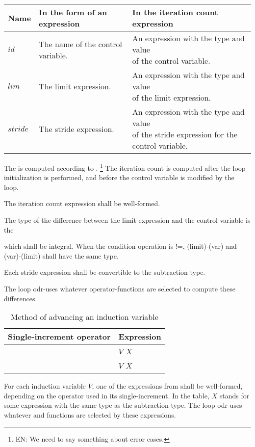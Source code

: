 \begin{table}[ht]
\begin{tabular}{|l|l|l|}
\hline
\bfseries Name&
\bfseries In the form of an expression&
\bfseries In the iteration count expression
\\ \hline
$id$&
The name of the control variable.&
\parbox[c][30pt]{2.5in}{
An expression with the type and value\\
of the control variable.
}
\\ \hline
$lim$&
The limit expression.&
\parbox[c][30pt]{2.5in}{
An expression with the type and value\\
of the limit expression.
}
\\ \hline
$stride$&
The stride expression.&
\parbox[c][40pt]{2.5in}{
An expression with the type and value\\
of the stride expression
for the control variable.
}
\\ \hline
\end{tabular}
\end{table}

The
is computed according to
.%
\footnote{EN:
We need to say something about error cases.
}
The iteration count is computed after the loop initialization is performed,
and before the control variable is modified by the loop.
\begin{cpp}
The iteration count expression shall be well-formed.
\end{cpp}

The type of the difference between the limit expression and the control variable
is the
%
\yescpp{,}
\begin{cpp}
which shall be integral.
When the condition operation is !=,
(limit)-(var) and (var)-(limit) shall have the same type.
\end{cpp}
Each stride expression shall be convertible to the subtraction type.
\begin{cpp}
The loop odr-uses whatever operator-functions are selected
to compute these differences.
\end{cpp}

\begin{cpp}

\begin{table}[ht]
\caption{
Method of advancing an induction variable
}
\label{tab:inc}
\centering
\begin{tabular}{|l|l|}
\hline
\bfseries Single-increment operator&
\bfseries Expression
\\ \hline
\tcode{++ += +}&
$V$ \tcode{+=} $X$
\\ \hline
\tcode{-- -= -}&
$V$ \tcode{-=} $X$
\\ \hline
\end{tabular}
\end{table}

For each induction variable
$V$,
one of the expressions from
shall be well-formed,
depending on the operator used in its single-increment.
In the table,
$X$
stands for some expression with the same type as the subtraction type.
The loop odr-uses whatever
and
functions are selected by these expressions.
\end{cpp}

